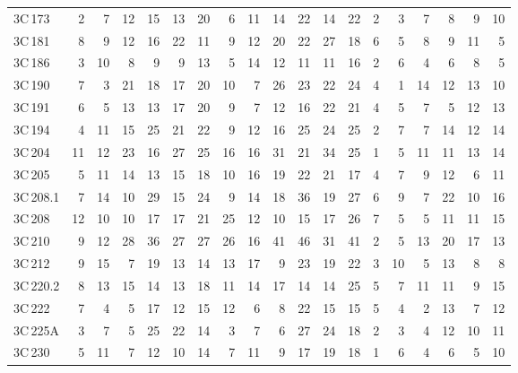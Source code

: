 \documentclass[mathleft,fleqn,%
]{an}
\begin{document}
\begin{table*}
\begin{tabular}{l|rrrrrr|rrrrrr|rrrrrr}
     3C\,173 &    2 &     7 &   12 &  15 &  13 &  20  &    6 &  11 &  14 &  22 &  14 &  22  &    2 &   3 &   7 &   8 &   9 &  10 \\
     3C\,181 &    8 &     9 &   12 &  16 &  22 &  11  &    9 &  12 &  20 &  22 &  27 &  18  &    6 &   5 &   8 &   9 &  11 &   5 \\
     3C\,186 &    3 &    10 &    8 &   9 &   9 &  13  &    5 &  14 &  12 &  11 &  11 &  16  &    2 &   6 &   4 &   6 &   8 &   5 \\
     3C\,190 &    7 &     3 &   21 &  18 &  17 &  20  &   10 &   7 &  26 &  23 &  22 &  24  &    4 &   1 &  14 &  12 &  13 &  10 \\
     3C\,191 &    6 &     5 &   13 &  13 &  17 &  20  &    9 &   7 &  12 &  16 &  22 &  21  &    4 &   5 &   7 &   5 &  12 &  13 \\
     3C\,194 &    4 &    11 &   15 &  25 &  21 &  22  &    9 &  12 &  16 &  25 &  24 &  25  &    2 &   7 &   7 &  14 &  12 &  14 \\
     3C\,204 &   11 &    12 &   23 &  16 &  27 &  25  &   16 &  16 &  31 &  21 &  34 &  25  &    1 &   5 &  11 &  11 &  13 &  14 \\
     3C\,205 &    5 &    11 &   14 &  13 &  15 &  18  &   10 &  16 &  19 &  22 &  21 &  17  &    4 &   7 &   9 &  12 &   6 &  11 \\
   3C\,208.1 &    7 &    14 &   10 &  29 &  15 &  24  &    9 &  14 &  18 &  36 &  19 &  27  &    6 &   9 &   7 &  22 &  10 &  16 \\
     3C\,208 &   12 &    10 &   10 &  17 &  17 &  21  &   25 &  12 &  10 &  15 &  17 &  26  &    7 &   5 &   5 &  11 &  11 &  15 \\
     3C\,210 &    9 &    12 &   28 &  36 &  27 &  27  &   26 &  16 &  41 &  46 &  31 &  41  &    2 &   5 &  13 &  20 &  17 &  13 \\
     3C\,212 &    9 &    15 &    7 &  19 &  13 &  14  &   13 &  17 &   9 &  23 &  19 &  22  &    3 &  10 &   5 &  13 &   8 &   8 \\
   3C\,220.2 &    8 &    13 &   15 &  14 &  13 &  18  &   11 &  14 &  17 &  14 &  14 &  25  &    5 &   7 &  11 &  11 &   9 &  15 \\
     3C\,222 &    7 &     4 &    5 &  17 &  12 &  15  &   12 &   6 &   8 &  22 &  15 &  15  &    5 &   4 &   2 &  13 &   7 &  12 \\
    3C\,225A &    3 &     7 &    5 &  25 &  22 &  14  &    3 &   7 &   6 &  27 &  24 &  18  &    2 &   3 &   4 &  12 &  10 &  11 \\
     3C\,230 &    5 &    11 &    7 &  12 &  10 &  14  &    7 &  11 &   9 &  17 &  19 &  18  &    1 &   6 &   4 &   6 &   5 &  10 \\

\end{tabular}
\end{table*}
\end{document}
